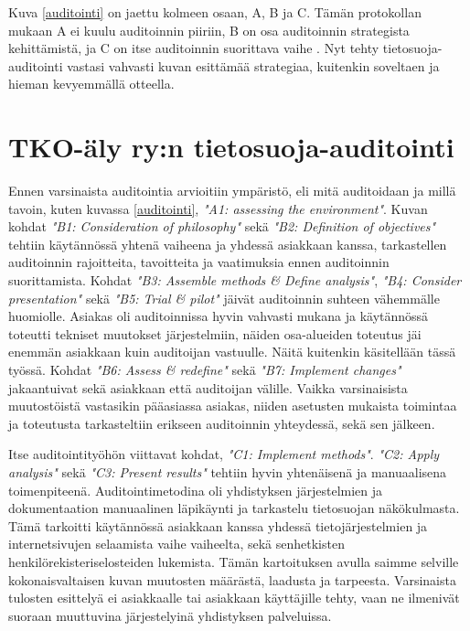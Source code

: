 \documentclass[finnish]{tktltiki}
\begin{document}
Kuva \ref{auditointi} on jaettu kolmeen osaan, A, B ja C. Tämän protokollan mukaan A ei kuulu auditoinnin piiriin, B on osa auditoinnin strategista kehittämistä, ja C on itse auditoinnin suorittava vaihe \cite{dimond}. Nyt tehty tietosuoja-auditointi vastasi vahvasti kuvan esittämää strategiaa, kuitenkin soveltaen ja hieman kevyemmällä otteella. 

\section{TKO-äly ry:n tietosuoja-auditointi}

Ennen varsinaista auditointia arvioitiin ympäristö, eli mitä auditoidaan ja millä tavoin, kuten kuvassa \ref{auditointi}, \textit{"A1: assessing the environment"}. Kuvan kohdat \textit{"B1: Consideration of philosophy"} sekä \textit{"B2: Definition of objectives"} tehtiin käytännössä yhtenä vaiheena ja yhdessä asiakkaan kanssa, tarkastellen auditoinnin rajoitteita, tavoitteita ja vaatimuksia ennen auditoinnin suorittamista. Kohdat \textit{"B3: Assemble methods \& Define analysis"}, \textit{"B4: Consider presentation"} sekä \textit{"B5: Trial \& pilot"} jäivät auditoinnin suhteen vähemmälle huomiolle. Asiakas oli auditoinnissa hyvin vahvasti mukana ja käytännössä toteutti tekniset muutokset järjestelmiin, näiden osa-alueiden toteutus jäi enemmän asiakkaan kuin auditoijan vastuulle. Näitä kuitenkin käsitellään tässä työssä. Kohdat \textit{"B6: Assess \& redefine"} sekä \textit{"B7: Implement changes"} jakaantuivat sekä asiakkaan että auditoijan välille. Vaikka varsinaisista muutostöistä vastasikin pääasiassa asiakas, niiden asetusten mukaista toimintaa ja toteutusta tarkasteltiin erikseen auditoinnin yhteydessä, sekä sen jälkeen. 

Itse auditointityöhön viittavat kohdat, \textit{"C1: Implement methods"}. \textit{"C2: Apply analysis"} sekä \textit{"C3: Present results"} tehtiin hyvin yhtenäisenä ja manuaalisena toimenpiteenä. Auditointimetodina oli yhdistyksen järjestelmien ja dokumentaation manuaalinen läpikäynti ja tarkastelu tietosuojan näkökulmasta. Tämä tarkoitti käytännössä asiakkaan kanssa yhdessä tietojärjestelmien ja internetsivujen selaamista vaihe vaiheelta, sekä senhetkisten henkilörekisteriselosteiden lukemista. Tämän kartoituksen avulla saimme selville kokonaisvaltaisen kuvan muutosten määrästä, laadusta ja tarpeesta. Varsinaista tulosten esittelyä ei asiakkaalle tai asiakkaan käyttäjille tehty, vaan ne ilmenivät suoraan muuttuvina järjestelyinä yhdistyksen palveluissa.
\end{document}

